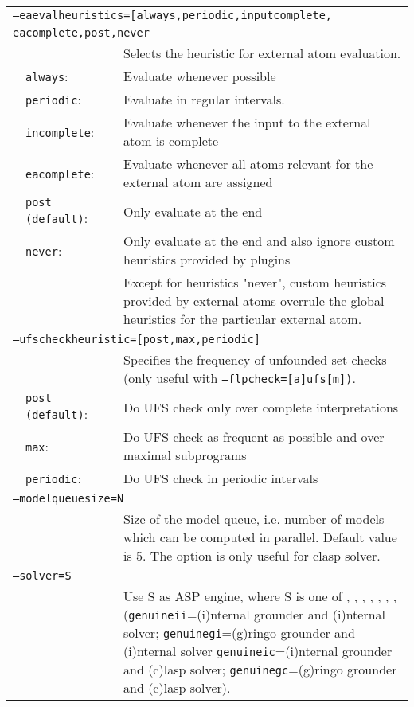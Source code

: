 \documentclass[a4paper, titlepage]{article}
\begin{document}
\begin{center}
\begin{longtable}{p{0.7cm}  p{2.2cm} p{0.3cm} p{6.3cm}  }
\multicolumn{4}{l}{\texttt{--eaevalheuristics=[always,periodic,inputcomplete,}}\\
\multicolumn{4}{l}{\texttt{eacomplete,post,never}}\\
& & & Selects the heuristic for external atom evaluation.\\
&\texttt{always}:&&Evaluate whenever possible\\
&\texttt{periodic}:&&Evaluate in regular intervals.\\
&\texttt{incomplete}:&&Evaluate whenever the input to the external atom is complete\\
&\texttt{eacomplete}:&& Evaluate whenever all atoms relevant for the external atom are assigned\\
&\texttt{post (default)}:&&Only evaluate at the end\\
&\texttt{never}:&&Only evaluate at the end and also ignore custom heuristics provided by plugins\\
&&&Except for heuristics "never", custom heuristics provided by external atoms overrule the global heuristics for the particular external atom.\\
\multicolumn{4}{l}{\texttt{--ufscheckheuristic=[post,max,periodic]}}\\
& & & Specifies the frequency of unfounded set checks (only useful with \texttt{--flpcheck=[a]ufs[m])}.\\
&\texttt{post (default)}:&&Do UFS check only over complete interpretations\\
&\texttt{max}:&&Do UFS check as frequent as possible and over maximal subprograms\\
&\texttt{periodic}:&&Do UFS check in periodic intervals\\
\multicolumn{4}{l}{\texttt{--modelqueuesize=N}}\\
& & & Size of the model queue, i.e. number of models which can be computed in parallel. Default value is 5. The option is only useful for clasp solver.\\
\multicolumn{4}{l}{\texttt{--solver=S}}\\
& & & Use S as ASP engine, where S is one of \dlv{}, \dlvdb{}, \libdlv{}, \libclingo{}, \genuineii{}, \genuinegi{}, \genuineic{}, \genuinegc{} (\texttt{genuineii}=(i)nternal grounder and (i)nternal solver; \texttt{genuinegi}=(g)ringo grounder and (i)nternal solver \texttt{genuineic}=(i)nternal grounder and (c)lasp solver; \texttt{genuinegc}=(g)ringo grounder and (c)lasp solver).\\

\end{longtable}
\end{center}
\end{document}
